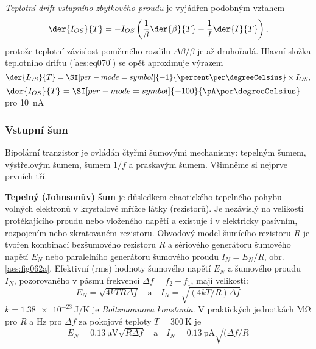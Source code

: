         \emph{Teplotní drift vstupního zbytkového proudu} je vyjádřen podobným vztahem
        \begin{equation}\label{aes:eq070}
          \der{I_{OS}}{T} = 
            -I_{OS}\left(\dfrac{1}{\beta}\der{\beta}{T} - \dfrac{1}{I}\der{I}{T}\right),
        \end{equation}
        protože teplotní závislost poměrného rozdílu \(\Delta\beta/\beta\) je až druhořadá. Hlavní
        složka teplotního driftu (\ref{aes:eq070}) se opět aproximuje výrazem
        \begin{equation}\label{aes:eq071}
          \der{I_{OS}}{T} = \SI[per-mode=symbol]{-1}{\percent\per\degreeCelsius}\times I_{OS},
        \end{equation}
        \(\der{I_{OS}}{T} =\SI[per-mode=symbol]{-100}{\pA\per\degreeCelsius}\) pro \qty{10}{\nA}
     
      \subsubsection{Vstupní šum}\label{aesIchIIIsecIIIssecX}  
        Bipolární tranzistor je ovládán čtyřmi šumovými mechanismy: tepelným šumem, výstřelovým
        šumem, šumem \(1/f\) a praskavým šumem. Všimněme si nejprve prvních tří.

        \textbf{Tepelný (Johnsonův) šum} je důsledkem chaotického tepelného pohybu volných elektronů
        v krystalové mřížce látky (rezistorů). Je nezávislý na velikosti protékajícího proudu nebo
        vloženého napětí a existuje i v elektricky pasívním, rozpojením nebo zkratovaném rezistoru.
        Obvodový model šumícího rezistoru \(R\) je tvořen kombinací bezšumového rezistoru \(R\) a
        sériového generátoru šumového napětí \(E_N\) nebo paralelního generátoru šumového proudu
        \(I_N = E_N/R\), obr. \ref{aes:fig062a}. Efektivní (rms) hodnoty šumového napětí \(E_N\) a
        šumového proudu \(I_N\), pozorovaného v pásmu frekvencí \(\Delta f =  f_2 - f_1\), mají
        velikosti:
        \begin{equation}\label{aes:eq072}
          E_N = \sqrt{4kTR\Delta f} \quad\text{a}\quad I_N = \sqrt{(4kT/R)\Delta f}
        \end{equation}
        \(k = \qty{1.38e-23 }{\joule\per\kelvin}\) je \emph{Boltzmannova konstanta}. V praktických
        jednotkách \unit{\mega\ohm} pro \(R\) a \unit{\Hz} pro \(\Delta f\) za pokojové teploty \(T=
        \qty{300}{\kelvin}\) je
        \begin{equation}\label{aes:eq073}
          E_N = \qty{0.13}{\uV}\sqrt{R\Delta f} \quad\text{a}\quad 
          I_N = \qty{0.13}{\pA}\sqrt{(\Delta f/R}
        \end{equation}

